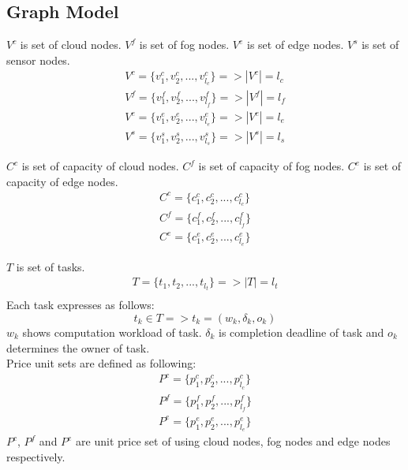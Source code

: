 \documentclass[conference]{IEEEtran}
\begin{document}
    \subsection{Graph Model}

    $V^c$ is set of cloud nodes.
    $V^f$ is set of fog nodes.
    $V^e$ is set of edge nodes.
    $V^s$ is set of sensor nodes.
    \begin{subequations}
      \begin{align}
          V^c = \{v_1^c, v_2^c, ..., v_{l_c}^c\} => |V^c| = l_c\\
          V^f = \{v_1^f, v_2^f, ..., v_{l_f}^f\} => |V^f| = l_f\\
          V^e = \{v_1^e, v_2^e, ..., v_{l_e}^e\} => |V^e| = l_e\\
          V^s = \{v_1^s, v_2^s, ..., v_{l_s}^s\} => |V^s| = l_s
      \end{align}
    \end{subequations}

    $C^c$ is set of capacity of cloud nodes.
    $C^f$ is set of capacity of fog nodes.
    $C^e$ is set of capacity of edge nodes.
    \begin{subequations}
      \begin{align}
          C^c = \{c_1^c, c_2^c, ..., c_{l_c}^c\}\\
          C^f = \{c_1^f, c_2^f, ..., c_{l_f}^f\}\\
          C^e = \{c_1^e, c_2^e, ..., c_{l_e}^e\}
      \end{align}
    \end{subequations}

    $T$ is set of tasks.
    \begin{subequations}
      \begin{align}
          T = \{t_1, t_2, ..., t_{l_t}\} => |T| = l_t\\
      \end{align}
    \end{subequations}
    Each task expresses as follows:
    \begin{equation}
      t_k \in T => t_k = (w_k, \delta_k, o_k)
    \end{equation}
    $w_k$ shows computation workload of task.
    $\delta_k$ is completion deadline of task and
    $o_k$ determines the owner of task.\\


    Price unit sets are defined as following:
    \begin{subequations}
      \begin{align}
        P^c = \{p_1^c, p_2^c, ..., p_{l_c}^c\}\\
        P^f = \{p_1^f, p_2^f, ..., p_{l_f}^f\}\\
        P^e = \{p_1^e, p_2^e, ..., p_{l_e}^e\}
      \end{align}
    \end{subequations}
    $P^c$, $P^f$ and $P^e$ are unit price set of using cloud nodes,
    fog nodes and edge nodes respectively.
\end{document}
